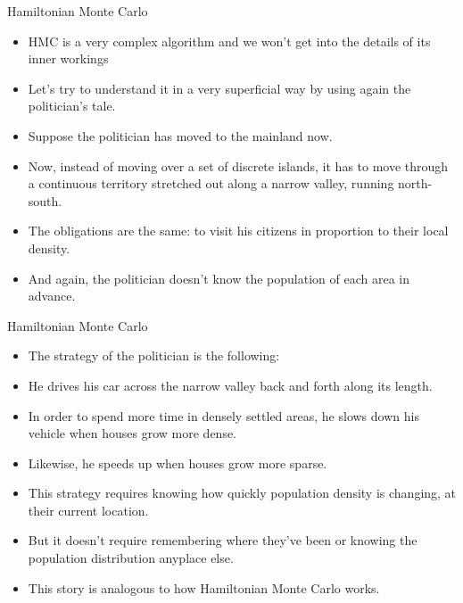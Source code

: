 \documentclass[handout]{beamer}
\begin{document}
\begin{frame}{Hamiltonian Monte Carlo}
\scriptsize{

\begin{itemize}
\item HMC is a very complex algorithm and we won't get into the details of its inner workings

\item Let's try to understand it in a very superficial way by using again the politician's tale.

\item Suppose the politician has moved to the mainland now.

\item Now, instead of moving over a set of discrete islands, it has to move through a continuous territory stretched out along a narrow valley, running north-south.  

\item The obligations are the same: to visit his citizens in proportion to their local density.

\item And again, the politician doesn't know the population of each area in advance.

\end{itemize}


} 
\end{frame}


\begin{frame}{Hamiltonian Monte Carlo}
\scriptsize{

\begin{itemize}
\item The strategy of the politician is the following:

\item He drives his car across the narrow valley back and forth along its length.

\item In order to spend more time in densely settled areas, he slows down his  vehicle when houses grow
more dense. 
\item Likewise, he speeds up when houses grow more sparse. 
\item This strategy requires knowing how quickly population density is changing, at their current location. 

\item But it doesn't require remembering where they've been or knowing the population distribution anyplace else.

\item This story is analogous to how Hamiltonian Monte Carlo works.

\end{itemize}


} 
\end{frame}
\end{document}
